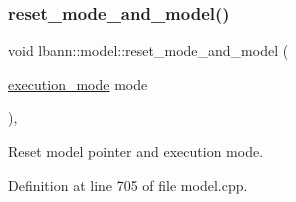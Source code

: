 \subsubsection{\texorpdfstring{reset\+\_\+mode\+\_\+and\+\_\+model()}{reset\_mode\_and\_model()}}
{\footnotesize\ttfamily void lbann\+::model\+::reset\+\_\+mode\+\_\+and\+\_\+model (\begin{DoxyParamCaption}\item[{\hyperlink{base_8hpp_a2781a159088df64ed7d47cc91c4dc0a8}{execution\+\_\+mode}}]{mode }\end{DoxyParamCaption})\hspace{0.3cm}{\ttfamily [protected]}, {\ttfamily [virtual]}}

Reset model pointer and execution mode. 

Definition at line 705 of file model.\+cpp.


